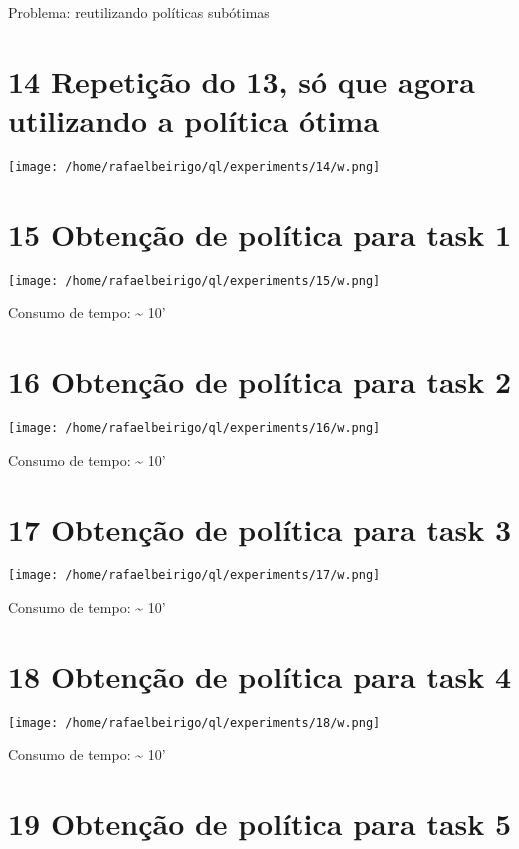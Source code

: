 \documentclass[11pt]{article}
\begin{document}
Problema: reutilizando políticas subótimas


\section{14 Repetição do 13, só que agora utilizando a política ótima}
\label{sec-15}

\centerline{\texttt{[image: /home/rafaelbeirigo/ql/experiments/14/w.png]}}



\section{15 Obtenção de política para task 1}
\label{sec-16}

\centerline{\texttt{[image: /home/rafaelbeirigo/ql/experiments/15/w.png]}}

  Consumo de tempo: \~{} 10'


\section{16 Obtenção de política para task 2}
\label{sec-17}

\centerline{\texttt{[image: /home/rafaelbeirigo/ql/experiments/16/w.png]}}

  Consumo de tempo: \~{} 10'


\section{17 Obtenção de política para task 3}
\label{sec-18}

\centerline{\texttt{[image: /home/rafaelbeirigo/ql/experiments/17/w.png]}}

  Consumo de tempo: \~{} 10'


\section{18 Obtenção de política para task 4}
\label{sec-19}

\centerline{\texttt{[image: /home/rafaelbeirigo/ql/experiments/18/w.png]}}

  Consumo de tempo: \~{} 10'


\section{19 Obtenção de política para task 5}
\label{sec-20}
\end{document}
